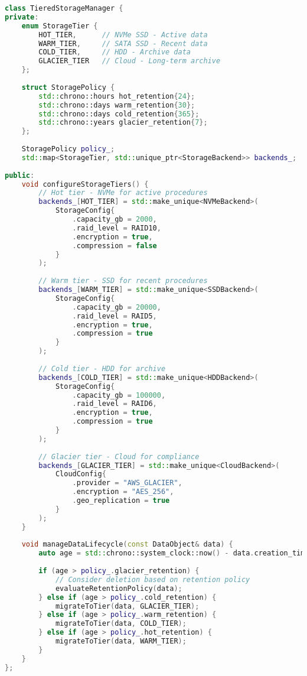 \begin{lstlisting}[language=C++, caption={Tiered Storage Manager}, label={lst:tiered-storage}]
class TieredStorageManager {
private:
    enum StorageTier {
        HOT_TIER,      // NVMe SSD - Active data
        WARM_TIER,     // SATA SSD - Recent data
        COLD_TIER,     // HDD - Archive data
        GLACIER_TIER   // Cloud - Long-term archive
    };
    
    struct StoragePolicy {
        std::chrono::hours hot_retention{24};
        std::chrono::days warm_retention{30};
        std::chrono::days cold_retention{365};
        std::chrono::years glacier_retention{7};
    };
    
    StoragePolicy policy_;
    std::map<StorageTier, std::unique_ptr<StorageBackend>> backends_;
    
public:
    void configureStorageTiers() {
        // Hot tier - NVMe for active procedures
        backends_[HOT_TIER] = std::make_unique<NVMeBackend>(
            StorageConfig{
                .capacity_gb = 2000,
                .raid_level = RAID10,
                .encryption = true,
                .compression = false
            }
        );
        
        // Warm tier - SSD for recent procedures
        backends_[WARM_TIER] = std::make_unique<SSDBackend>(
            StorageConfig{
                .capacity_gb = 20000,
                .raid_level = RAID5,
                .encryption = true,
                .compression = true
            }
        );
        
        // Cold tier - HDD for archive
        backends_[COLD_TIER] = std::make_unique<HDDBackend>(
            StorageConfig{
                .capacity_gb = 100000,
                .raid_level = RAID6,
                .encryption = true,
                .compression = true
            }
        );
        
        // Glacier tier - Cloud for compliance
        backends_[GLACIER_TIER] = std::make_unique<CloudBackend>(
            CloudConfig{
                .provider = "AWS_GLACIER",
                .encryption = "AES_256",
                .geo_replication = true
            }
        );
    }
    
    void manageDataLifecycle(const DataObject& data) {
        auto age = std::chrono::system_clock::now() - data.creation_time;
        
        if (age > policy_.glacier_retention) {
            // Consider deletion based on retention policy
            evaluateRetentionPolicy(data);
        } else if (age > policy_.cold_retention) {
            migrateToTier(data, GLACIER_TIER);
        } else if (age > policy_.warm_retention) {
            migrateToTier(data, COLD_TIER);
        } else if (age > policy_.hot_retention) {
            migrateToTier(data, WARM_TIER);
        }
    }
};
\end{lstlisting}


